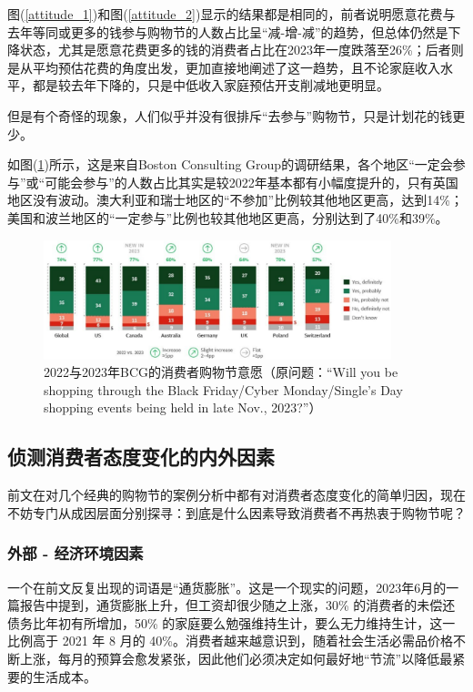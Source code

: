 \documentclass[12pt]{ctexart}
\begin{document}
图(\ref{attitude_1})和图(\ref{attitude_2})显示的结果都是相同的，前者说明愿意花费与去年等同或更多的钱参与购物节的人数占比呈“减-增-减”的趋势，但总体仍然是下降状态，尤其是愿意花费更多的钱的消费者占比在2023年一度跌落至26\%；后者则是从平均预估花费的角度出发，更加直接地阐述了这一趋势，且不论家庭收入水平，都是较去年下降的，只是中低收入家庭预估开支削减地更明显。

但是有个奇怪的现象，人们似乎并没有很排斥“去参与”购物节，只是计划花的钱更少。

如图(\ref{attitude_3})所示，这是来自Boston Consulting Group的调研结果，各个地区“一定会参与”或“可能会参与”的人数占比其实是较2022年基本都有小幅度提升的，只有英国地区没有波动。澳大利亚和瑞士地区的“不参加”比例较其他地区更高，达到14\%；美国和波兰地区的“一定参与”比例也较其他地区更高，分别达到了40\%和39\%。


\begin{figure}[htbp!]
    \centering
    \includegraphics[width=0.9\textwidth]{Images/22.png}
    \caption{2022与2023年BCG的消费者购物节意愿（原问题：“Will you be shopping through the Black Friday/Cyber Monday/Single's Day shopping events being held in late Nov., 2023?”） \cite{39}}
    \label{attitude_3}
\end{figure}








\subsection{侦测消费者态度变化的内外因素}

前文在对几个经典的购物节的案例分析中都有对消费者态度变化的简单归因，现在不妨专门从成因层面分别探寻：到底是什么因素导致消费者不再热衷于购物节呢？

\subsubsection{外部 - 经济环境因素}
一个在前文反复出现的词语是“通货膨胀”。这是一个现实的问题，2023年6月的一篇报告\cite{36}中提到，通货膨胀上升，但工资却很少随之上涨，30\% 的消费者的未偿还债务比年初有所增加，50\% 的家庭要么勉强维持生计，要么无力维持生计，这一比例高于 2021 年 8 月的 40\%。消费者越来越意识到，随着社会生活必需品价格不断上涨，每月的预算会愈发紧张，因此他们必须决定如何最好地“节流”以降低最紧要的生活成本\cite{35}。
\end{document}

